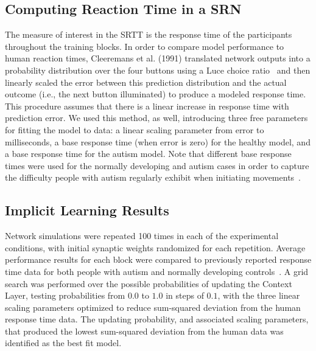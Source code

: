 \documentclass[man]{apa}
\begin{document}
\subsection{Computing Reaction Time in a SRN}
The measure of interest in the SRTT is the response time of the participants throughout the training blocks.  In order to compare model performance to human reaction times, Cleeremans et al. (1991) \nocite{Cleeremans:1991:SSRT} translated network outputs into a probability distribution over the four buttons using a Luce choice ratio~\cite{Luce:1963} and then linearly scaled the error between this prediction distribution and the actual outcome (i.e., the next button illuminated) to produce a modeled response time.  This procedure assumes that there is a linear increase in response time with prediction error.  We used this method, as well, introducing three free parameters for fitting the model to data: a linear scaling parameter from error to milliseconds, a base response time (when error is zero) for the healthy model, and a base response time for the autism model.  Note that different base response times were used for the normally developing and autism cases in order to capture the difficulty people with autism regularly exhibit when initiating
movements~\cite{RefWorks:100}.

\subsection{Implicit Learning Results}

Network simulations were repeated 100 times in each of the experimental conditions, with initial synaptic weights randomized for each repetition.  Average performance results for each block were compared to previously reported response time data for both people with autism and normally developing controls~\cite{RefWorks:148}.  A grid search was performed over the possible probabilities of updating the Context Layer, testing probabilities from $0.0$ to $1.0$ in steps of $0.1$, with the three linear scaling parameters optimized to reduce sum-squared deviation from the human response time data.  The updating probability, and associated scaling parameters, that produced the lowest sum-squared deviation from the human data was identified as the
best fit model.
\end{document}
